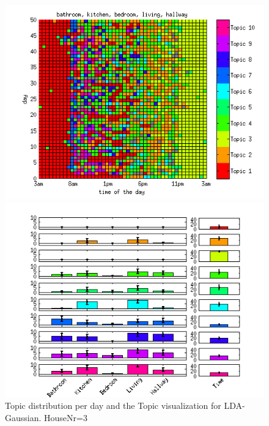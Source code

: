 \begin{figure}
 \centering
 \begin{minipage}[b]{0.45\linewidth}
  \centering
  \includegraphics[width=\textwidth]{Pictures/Gaus/DayHN3TS48k20.png}
 \end{minipage}
 \begin{minipage}[b]{0.45\linewidth}
  \centering
  \includegraphics[width=\textwidth]{Pictures/Gaus/TopHN3TS48k20.png}
 \end{minipage}
 \caption{Topic distribution per day and the Topic visualization for LDA-Gaussian. HouseNr=3}
\end{figure}

